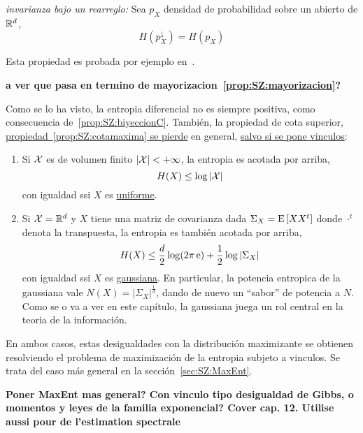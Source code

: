 \begin{propiedadesC}\setcounter{enumi}{\value{PropPermutacion}}
\item\label{prop:SZ:permutacionC} {\it invarianza  bajo un rearreglo:} Sea $p_X$
  densidad   de  probabilidad   sobre   un  abierto   de  $\mathbb{R}^d$,
  \[
  H\left( p_X^\downarrow \right) = H(p_X)
  \]
\end{propiedadesC}
%
\noindent Esta propiedad es probada por ejemplo en~\cite{LieLos01, WanMad04}.

{\color{red}\bf      a      ver       que      pasa      en      termino      de
  mayorizacion~\ref{prop:SZ:mayorizacion}?}

Como  se lo  ha visto,  la  entropia diferencial  no es  siempre positiva,  como
consecuencia  de~\ref{prop:SZ:biyeccionC}.   Tambi\'en,  la  propiedad  de  cota
superior,  \underline{propiedad~\ref{prop:SZ:cotamaxima} se pierde}  en general,
\underline{salvo si se pone vinculos}:
%
\begin{propiedadesC}\setcounter{enumi}{\value{PropCotamaxima}}
\item
  \begin{enumerate}
  \item\label{prop:SZ:cotamaximauniforme} Si $\mathcal{X}$ es de volumen finito $|\mathcal{X}| < +
    \infty$, la entropia es acotada por arriba,
    \[
    H(X) \le \log |\mathcal{X}|
    \]
    con igualdad ssi $X$ es \underline{uniforme}.
  \item\label{prop:SZ:cotamaximagaussiana}  Si  $\mathcal{X} =\mathbb{R}^d$  y  $X$ tiene  una
    matriz  de covarianza  dada  $\Sigma_X  = \operatorname{E}\left[  X  X^t \right]$  donde
    $\cdot^t$  denota  la transpuesta,  la  entropia  es  tambi\'en acotada  por
    arriba,
    \[
    H(X) \le \frac{d}{2} \log(2 \pi \operatorname{e}) + \frac12 \log |\Sigma_X|
    \]
    con igualdad  ssi $X$ es \underline{gaussiana}.  En  particular, la potencia
    entropica de  la gaussiana vale $N(X) =  \left| \Sigma_X \right|^{\frac1d}$,
    dando de nuevo un  ``sabor'' de potencia a $N$.  Como se o  va a ver en este
    cap\'itulo,  la  gaussiana  juega  un   rol  central  en  la  teoria  de  la
    informaci\'on.
  \end{enumerate}
  En  ambos casos,  estas  desigualdades con  la  distribuci\'on maximizante  se
  obtienen resolviendo  el problema de  maximizaci\'on de la entropia  subjeto a
  vinculos. Se trata del caso m\'as general en la secci\'on~\ref{sec:SZ:MaxEnt}.
\end{propiedadesC}
%
{\bf\color{red} Poner MaxEnt mas general? Con vinculo tipo desigualdad de Gibbs,
  o momentos  y leyes de  la familia exponencial?  Cover cap. 12.  Utilise aussi
  pour de l'estimation spectrale}

